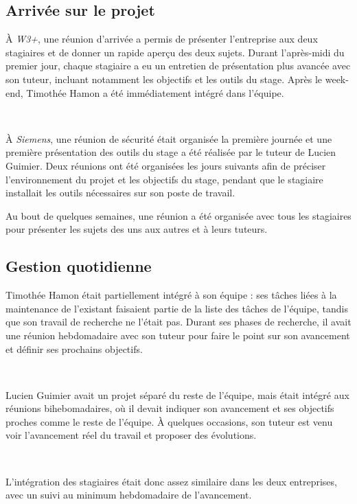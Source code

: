 \documentclass[a4paper, oneside, 12pt]{article}
\def\www{\emph{W3+}}
\def\siemens{\emph{Siemens}}
\begin{document}
\subsection{Arrivée sur le projet}

À \www, une réunion d’arrivée a permis de présenter l’entreprise aux deux stagiaires et de donner un rapide aperçu des deux sujets. Durant l’après-midi du premier jour, chaque stagiaire a eu un entretien de présentation plus avancée avec son tuteur, incluant notamment les objectifs et les outils du stage. Après le week-end, Timothée {\sc Hamon} a été immédiatement intégré dans l’équipe.

\ 

À \siemens, une réunion de sécurité était organisée la première journée et une première présentation des outils du stage a été réalisée par le tuteur de Lucien {\sc Guimier}. Deux réunions ont été organisées les jours suivants afin de préciser l’environnement du projet et les objectifs du stage, pendant que le stagiaire installait les outils nécessaires sur son poste de travail.

Au bout de quelques semaines, une réunion a été organisée avec tous les stagiaires pour présenter les sujets des uns aux autres et à leurs tuteurs.

\vfill

\newpage

\subsection{Gestion quotidienne}

Timothée {\sc Hamon} était partiellement intégré à son équipe : ses tâches liées à la maintenance de l’existant faisaient partie de la liste des tâches de l’équipe, tandis que son travail de recherche ne l’était pas. Durant ses phases de recherche, il avait une réunion hebdomadaire avec son tuteur pour faire le point sur son avancement et définir ses prochains objectifs.

\ 

Lucien {\sc Guimier} avait un projet séparé du reste de l’équipe, mais était intégré aux réunions bihebomadaires, où il devait indiquer son avancement et ses objectifs proches comme le reste de l’équipe. À quelques occasions, son tuteur est venu voir l’avancement réel du travail et proposer des évolutions.

\ 

L’intégration des stagiaires était donc assez similaire dans les deux entreprises, avec un suivi au minimum hebdomadaire de l’avancement.
\end{document}
